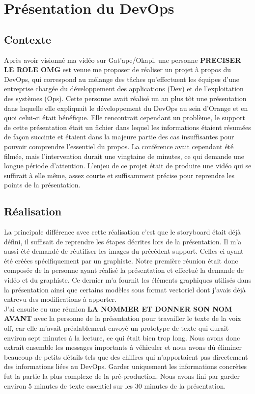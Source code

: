 \section{Présentation du DevOps}


\subsection{Contexte}

Après avoir visionné ma vidéo sur Gat'ape/Okapi, une personne \textbf{PRECISER LE ROLE OMG} est venue me proposer de réaliser un projet à propos du DevOps, qui correspond au mélange des tâches qu'effectuent les équipes d'une entreprise chargée du développement des applications (Dev) et de l'exploitation des systèmes (Ops). Cette personne avait réalisé un an plus tôt une présentation dans laquelle elle expliquait le développement du DevOps au sein d'Orange et en quoi celui-ci était bénéfique. Elle rencontrait cependant un problème, le support de cette présentation était un fichier dans lequel les informations étaient résumées de façon succinte et étaient dans la majeure partie des cas insuffisantes pour pouvoir comprendre l'essentiel du propos. La conférence avait cependant été filmée, mais l'intervention durait une vingtaine de minutes, ce qui demande une longue période d'attention. L'enjeu de ce projet était de produire une vidéo qui se suffirait à elle même, assez courte et suffisamment précise pour reprendre les points de la présentation.


\subsection{Réalisation}
La principale différence avec cette réalisation c'est que le storyboard était déjà défini, il suffisait de reprendre les étapes décrites lors de la présentation. Il m'a aussi été demandé de réutiliser les images du précédent support. Celles-ci ayant été créées spécifiquement par un graphiste. Notre première réunion était donc composée de la personne ayant réalisé la présentation et effectué la demande de vidéo et du graphiste. Ce dernier m'a fournit les éléments graphiques utilisés dans la présentation ainsi que certains modèles sous format vectoriel dont j'avais déjà entrevu des modifications à apporter.\\

J'ai ensuite eu une réunion \textbf{LA NOMMER ET DONNER SON NOM AVANT} avec la personne de la présentation pour travailler le texte de la voix off, car elle m'avait préalablement envoyé un prototype de texte qui durait environ sept minutes à la lecture, ce qui était bien trop long. Nous avons donc extrait ensemble les messages importants à véhiculer et nous avons dû éliminer beaucoup de petits détails tels que des chiffres qui n'apportaient pas directement des informations liées au DevOps. Garder uniquement les informations concrètes fut la partie la plus complexe de la pré-production. Nous avons fini par garder environ 5 minutes de texte essentiel sur les 30 minutes de la présentation.\\

